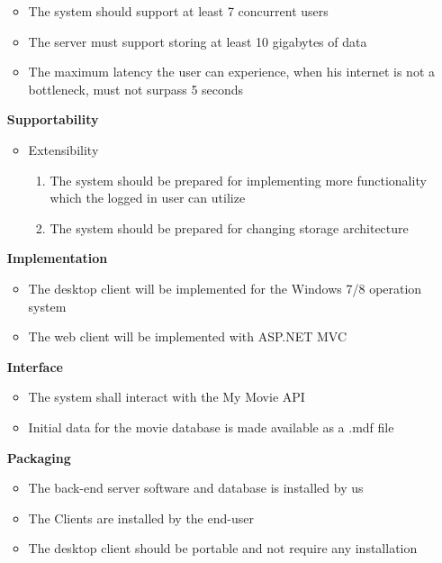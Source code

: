 \begin{itemize}
\vspace{0.2cm}

\begin{itemize}
\item The system should support at least 7 concurrent users
\item The server must support storing at least 10 gigabytes of data
\item The maximum latency the user can experience, when his internet is not a bottleneck, must not surpass 5 seconds
\end{itemize}

\vspace{0.2cm}
\item[\textbf{Supportability}]
\begin{itemize}
\item Extensibility
\begin{enumerate}
\item The system should be prepared for implementing more functionality which the logged in user can utilize
\item The system should be prepared for changing storage architecture
\end{enumerate}
\end{itemize}

\vspace{0.2cm}
\item[\textbf{Implementation}]
\begin{itemize}
\item The desktop client will be implemented for the Windows 7/8 operation system
\item The web client will be implemented with ASP.NET MVC
\end{itemize}

\vspace{0.2cm}
\item[\textbf{Interface}]
\begin{itemize}
\item The system shall interact with the My Movie API
\item Initial data for the movie database is made available as a .mdf file
\end{itemize}

\vspace{0.2cm}
\item[\textbf{Packaging}]
\begin{itemize}
\item The back-end server software and database is installed by us
\item The Clients are installed by the end-user
\item The desktop client should be portable and not require any installation
\end{itemize}

\end{itemize}


